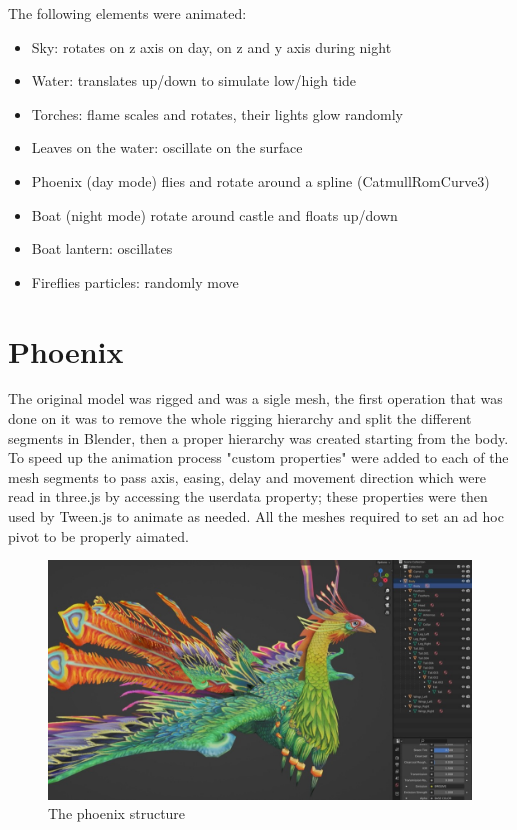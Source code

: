 \documentclass[10pt,a4paper]{article}
\begin{document}
\bigbreak

The following elements were animated:
\begin{itemize}
 \item Sky: rotates on z axis on day, on z and y axis during night
 \item Water: translates up/down to simulate low/high tide
 \item Torches: flame scales and rotates, their lights glow randomly
 \item Leaves on the water: oscillate on the surface
 \item Phoenix (day mode) flies and rotate around a spline (CatmullRomCurve3)
 \item Boat (night mode) rotate around castle and floats up/down
 \item Boat lantern: oscillates
 \item Fireflies particles: randomly move
 \end{itemize}

\section{Phoenix}

The original model was rigged and was a sigle mesh, the first operation that was done on it was to remove the whole rigging hierarchy and split the different segments in Blender, then a proper hierarchy was created starting  from the body. To speed up the animation process "custom properties" were  added to each of the mesh segments to pass axis, easing, delay and movement direction which were read in three.js by accessing the userdata property; these properties were then used by Tween.js to animate as needed. All the meshes required to set an ad hoc pivot to be properly aimated.

\begin{figure}[H]
   \caption{The phoenix structure}
  \includegraphics[width=1\textwidth]{phoenix}
\end{figure}
\end{document}
